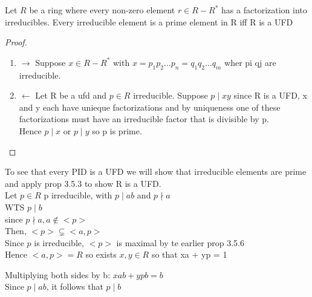 \documentclass{article}
\begin{document}
    \begin{proposition}[3.5.3]
        Let $R$ be a ring where every non-zero element $r \in R - R^*$ has a factorization into irreducibles. Every irreducible element is a prime element in R iff R is a UFD
        
    \end{proposition}
    \begin{proof}
        \begin{enumerate}
            \item $\rightarrow$ Suppose $x \in R - R^*$ with $x =p_1p_2 \dots p_n = q_1q_2 \dots q_m$ wher pi qj are irreducible. 
            \item $\leftarrow $ Let R be a ufd and $p \in R$ irreducible. Suppose $p \mid xy$ since R is a UFD, x and y each have unieque factorizations and by uniqueness one of these factorizations must have an irreducible factor that is divisible by p. \\ Hence $p \mid x$ or $p \mid y$ so p is prime.            
        \end{enumerate}
    \end{proof}

    
    To see that every PID is a UFD we will show that irreducible elements are prime and apply prop 3.5.3 to show R is a UFD. \\ 
    Let $p \in R$ p irreducible, with $p \mid ab $ and $p \nmid a$ \\ WTS 
    $p\mid b$  \\ since $p \nmid a, a \not \in <p> $  \\ 
    Then, $<p> \subsetneq <a, p>$ \\ Since $p$ is irreducible, $<p> $ is maximal by te earlier prop 3.5.6 \\ Hence $<a, p> = R$ so exists $x,y \in R $ so that xa + yp = 1 

    
    Multiplying both sides by b: $xab + ypb = b$  \\ 
    Since $p \mid ab$, it follows that $p \mid b$   
\end{document}
